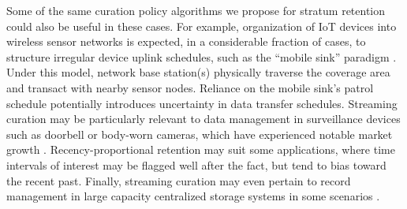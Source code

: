 
Some of the same curation policy algorithms we propose for stratum retention could also be useful in these cases.
For example, organization of IoT devices into wireless sensor networks is expected, in a considerable fraction of cases, to structure irregular device uplink schedules, such as the ``mobile sink'' paradigm \citep{jain2022survey}.
Under this model, network base station(s) physically traverse the coverage area and transact with nearby sensor nodes.
Reliance on the mobile sink's patrol schedule potentially introduces uncertainty in data transfer schedules.
Streaming curation may be particularly relevant to data management in surveillance devices such as doorbell or body-worn cameras, which have experienced notable market growth \citep{calacci2022cop,lum2019research}.
Recency-proportional retention may suit some applications, where time intervals of interest may be flagged well after the fact, but tend to bias toward the recent past.
Finally, streaming curation may even pertain to record management in large capacity centralized storage systems in some scenarios \citep{bhat2018data}.


